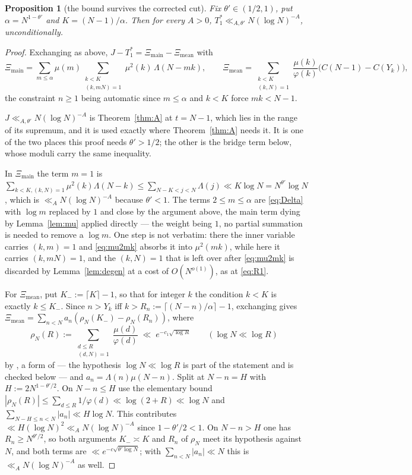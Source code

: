 \documentclass[11pt,a4paper]{article}
\theoremstyle{plain}
\newtheorem{proposition}[theorem]{Proposition}
\theoremstyle{definition}
\theoremstyle{remark}
\begin{document}
\begin{proposition}[the bound survives the corrected cut]%
\label{prop:movingcut}
Fix $\theta'\in(1/2,1)$, put $\alpha=N^{1-\theta'}$ and
$K=(N-1)/\alpha$. Then for every $A>0$,
$T_1^\ast\ll_{A,\theta'}N(\log N)^{-A}$, unconditionally.
\end{proposition}

\begin{proof}
Exchanging as above,
$J-T_1^\ast=\Xi_{\mathrm{main}}-\Xi_{\mathrm{mean}}$ with
\[
  \Xi_{\mathrm{main}}=\sum_{m\le\alpha}\mu(m)\!\!
    \sum_{\substack{k<K\\ (k,mN)=1}}\!\!\mu^2(k)\,\Lambda(N-mk),
  \qquad
  \Xi_{\mathrm{mean}}=\!\!\sum_{\substack{k<K\\(k,N)=1}}\!\!
    \frac{\mu(k)}{\varphi(k)}\bigl(C(N-1)-C(Y_k)\bigr),
\]
the constraint $n\ge1$ being automatic since $m\le\alpha$ and $k<K$
force $mk<N-1$.

$J\ll_{A,\theta'}N(\log N)^{-A}$ is Theorem~\ref{thm:A} at $t=N-1$,
which lies in the range of its supremum, and it is used exactly where
Theorem~\ref{thm:A} needs it. It is one of the two places this proof
needs $\theta'>1/2$; the other is the bridge term below, whose moduli
carry the same inequality.

In $\Xi_{\mathrm{main}}$ the term $m=1$ is
$\sum_{k<K,(k,N)=1}\mu^2(k)\Lambda(N-k)\le\sum_{N-K<j<N}\Lambda(j)\ll
K\log N=N^{\theta'}\log N$, which is $\ll_AN(\log N)^{-A}$ because
$\theta'<1$. The terms $2\le m\le\alpha$ are \eqref{eq:Delta} with
$\log m$ replaced by $1$ and close by the argument above, the main term
dying by Lemma~\ref{lem:mu} applied directly --- the weight being $1$,
no partial summation is needed to remove a $\log m$. One step is not
verbatim: there the inner variable carries $(k,m)=1$ and
\eqref{eq:mu2mk} absorbs it into $\mu^2(mk)$, while here it carries
$(k,mN)=1$, and the $(k,N)=1$ that is left over after \eqref{eq:mu2mk}
is discarded by Lemma~\ref{lem:degen} at a cost of $O(N^{o(1)})$, as at
\eqref{eq:R1}.

For $\Xi_{\mathrm{mean}}$, put $K_-:=\lceil K\rceil-1$, so that
for integer $k$ the condition $k<K$ is exactly $k\le K_-$. Since
$n>Y_k$ iff $k>R_n:=\lceil(N-n)/\alpha\rceil-1$, exchanging gives
$\Xi_{\mathrm{mean}}=\sum_{n<N}a_n(\rho_N(K_-)-\rho_N(R_n))$, where
\[
  \rho_N(R):=\sum_{\substack{d\le R\\ (d,N)=1}}\frac{\mu(d)}{\varphi(d)}
  \;\ll\;e^{-c_1\sqrt{\log R}}
  \qquad(\log N\ll\log R)
\]
by \cite[Lemma~1]{HL}, a form of \cite[Lemma~2.1]{GY} --- the
hypothesis $\log N\ll\log R$ is part of the statement and is checked
below --- and $a_n=\Lambda(n)\mu(N-n)$. Split at $N-n=H$ with
$H:=2N^{1-\theta'/2}$. On $N-n\le H$ use the elementary bound
$|\rho_N(R)|\le\sum_{d\le R}1/\varphi(d)\ll\log(2+R)\ll\log N$
and $\sum_{N-H\le n<N}|a_n|\ll H\log N$.  This contributes
$\ll H(\log N)^2\ll_AN(\log N)^{-A}$ since
$1-\theta'/2<1$. On $N-n>H$ one has $R_n\ge N^{\theta'/2}$, so
both arguments $K_-\asymp K$ and $R_n$ of $\rho_N$ meet its hypothesis
against $N$, and both
terms are $\ll e^{-c\sqrt{\theta'\log N}}$; with
$\sum_{n<N}|a_n|\ll N$ this is $\ll_AN(\log N)^{-A}$ as well.
\end{proof}
\end{document}
